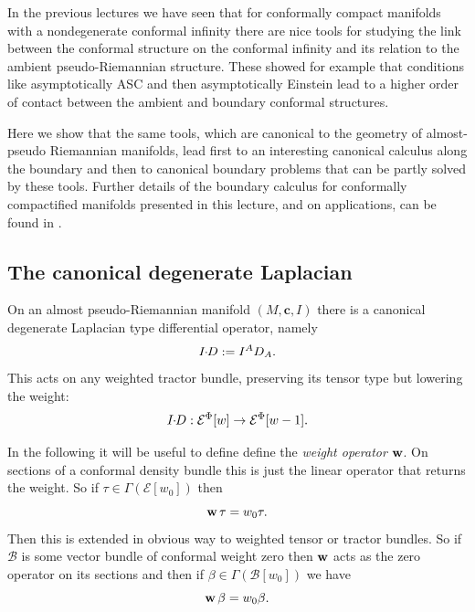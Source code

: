 \documentclass[a4paper,12pt]{amsart}
\def\g{g_+}
\def\Cal{\mathcal}
\newcommand{\cc}{\boldsymbol{c}}
\newcommand{\ce}{{\Cal E}}
\def\cB{\mathcal{B}}
\theoremstyle{remark}
\begin{document}
In the previous lectures we have seen that for conformally compact
manifolds with a nondegenerate conformal infinity there are nice tools for studying the link between the conformal structure on the conformal infinity and its relation to the ambient pseudo-Riemannian structure. These showed for example that conditions like asymptotically ASC and then asymptotically Einstein lead to a higher order of contact between the ambient and boundary conformal structures. 

Here we show that the same tools, which are canonical to the geometry  of almost-pseudo Riemannian manifolds, lead first to an interesting canonical calculus along the boundary and then to canonical boundary problems that can be partly solved by these tools. Further details of the boundary calculus for conformally compactified manifolds presented in this lecture, and on applications, can be found in \cite{GLW,GoW-boundcalc, GoW-willmore}.


\newcommand{\w}{\mbox{\bf w}}
\newcommand{\ID}{I\hspace*{-1mm} \cdot \hspace*{-1mm} D}
\subsection{The canonical degenerate Laplacian} \label{degL} On an almost pseudo-Riemannian manifold $(M,\cc,I)$ there is a canonical degenerate Laplacian type differential operator, namely 
$$
\ID:= I^AD_A.
$$
This acts on any weighted tractor bundle, preserving its tensor type
but lowering the weight:
$$
\ID : \ce^\Phi[w]\to  \ce^\Phi[w-1].
$$

In the following it will be useful to define 
define the {\em weight operator} $\w$. On
sections of a conformal density bundle this is just the linear
operator that returns the weight. So if $\tau\in \Gamma (\ce[w_0])$ then
$$
\w \, \tau = w_0 \tau.
$$ Then this is extended in obvious way to weighted tensor or tractor
bundles. So if $\cB$ is some vector bundle of conformal weight zero
then $\w$ acts as the zero operator on its sections and then if $\beta
\in \Gamma (\cB[w_0])$ we have
$$
\w \, \beta = w_0 \beta.
$$ 
\end{document}
